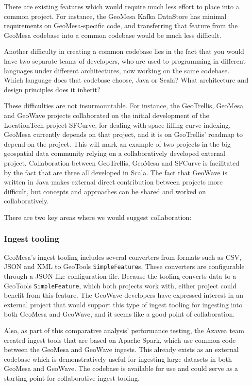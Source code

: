 There are existing features which would require much less effort to place into a common project.
For instance, the GeoMesa Kafka DataStore has minimal requirements on GeoMesa-specific code, and transferring that feature from the GeoMesa codebase into a common codebase would be much less difficult.

Another difficulty in creating a common codebase lies in the fact that you would have two separate teams of developers, who are used to programming in different languages under different architectures, now working on the same codebase.
Which language does that codebase choose, Java or Scala? What architecture and design principles does it inherit?

These difficulties are not insurmountable.
For instance, the GeoTrellis, GeoMesa and GeoWave projects collaborated on the initial development of the LocationTech project SFCurve, for dealing with space filling curve indexing.
GeoMesa currently depends on that project, and it is on GeoTrellis' roadmap to depend on the project.
This will mark an example of two projects in the big geospatial data community relying on a collaboratively developed external project.
Collaboration between GeoTrellis, GeoMesa and SFCurve is facilitated by the fact that are three all developed in Scala.
The fact that GeoWave is written in Java makes external direct contribution between projects more difficult, but concepts and approaches can be shared and worked on collaboratively.

There are two key areas where we would suggest collaboration:


\subsubsection{Ingest tooling}
\label{sec:conclusions:collaboration:ingest}

GeoMesa's ingest tooling includes several converters from formats such as CSV, JSON and XML to GeoTools \texttt{SimpleFeature}s.
These converters are configurable through a JSON-like configuration file.
Because the tooling converts data to a GeoTools \texttt{SimpleFeature}, which both projects work with, either project could benefit from this feature.
The GeoWave developers have expressed interest in an external project that would support this type of ingest tooling for ingesting into both GeoMesa and GeoWave, and it seems like a good point of collaboration.

Also, as part of this comparative analysis' performance testing, the Azavea team created ingest tools that are based on Apache Spark, which use common code between the GeoMesa and GeoWave ingests.
This already exists as an external codebase which is demonstratively useful for ingesting large datasets in both GeoMesa and GeoWave.
The codebase is available for use and could serve as a starting point for collaborative ingest tooling.


